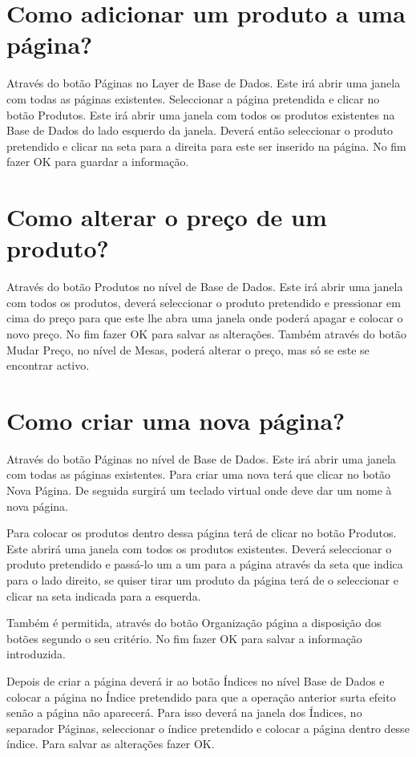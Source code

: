 \documentclass[a4paper,11pt,openany]{memoir}
\begin{document}
\section{Como adicionar um produto a uma página?}
Através do botão Páginas no Layer de Base de Dados. Este irá abrir uma janela com
todas as páginas existentes. Seleccionar a página pretendida e clicar no botão
Produtos. Este irá abrir uma janela com todos os produtos existentes na Base de
Dados do lado esquerdo da janela. Deverá então seleccionar o produto pretendido e
clicar na seta para a direita para este ser inserido na página. No fim fazer OK para
guardar a informação.

\section{Como alterar o preço de um produto?}

Através do botão Produtos no nível de Base de Dados. Este irá abrir uma janela com
todos os produtos, deverá seleccionar o produto pretendido e pressionar em cima do
preço para que este lhe abra uma janela onde poderá apagar e colocar o novo
preço. No fim fazer OK para salvar as alterações. Também através do botão Mudar
Preço, no nível de Mesas, poderá alterar o preço, mas só se este se encontrar
activo.

\section{Como criar uma nova página?}
Através do botão Páginas no nível de Base de Dados. 
Este irá abrir uma janela com
todas as páginas existentes. Para criar uma nova terá que clicar no botão Nova
Página. De seguida surgirá um teclado virtual onde deve dar um nome à nova
página. 

Para colocar os produtos dentro dessa página terá de clicar no botão
Produtos. Este abrirá uma janela com todos os produtos existentes. Deverá
seleccionar o produto pretendido e passá-lo um a um para a página através da seta
que indica para o lado direito, se quiser tirar um produto da página terá de o
seleccionar e clicar na seta indicada para a esquerda. 

Também é permitida, através
do botão Organização página a disposição dos botões segundo o seu critério. No fim
fazer OK para salvar a informação introduzida. 

Depois de criar a página deverá ir ao
botão Índices no nível Base de Dados e colocar a página no Índice pretendido para
que a operação anterior surta efeito senão a página não aparecerá. Para isso deverá
na janela dos Índices, no separador Páginas, seleccionar o índice pretendido e
colocar a página dentro desse índice. Para salvar as alterações fazer OK.
\end{document}
